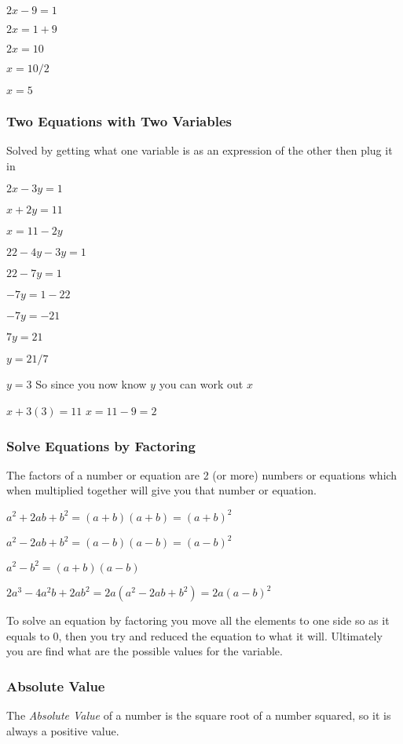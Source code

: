 \documentclass{article}
\begin{document}
$2x - 9 = 1$

$2x = 1 + 9 $

$2x = 10 $

$x = 10 /2 $

$x = 5$

\subsubsection{Two Equations with Two Variables}
Solved by getting what one variable is as an expression of the other then plug it in

$2x -3y = 1 $  
       
$x + 2y = 11 $	     

$x = 11 -2y$

$22-4y -3y = 1$

$22 - 7y = 1$

$-7y = 1-22$

$-7y = -21$

$7y = 21$

$y =21/7$

$y = 3$
So since you now know $y$ you can work out $x$

$x + 3 (3) = 11$
$x = 11 -9 = 2$

\subsubsection{Solve Equations by Factoring}
The factors of a number or equation are 2 (or more) numbers or equations which when multiplied together will give you that number or equation.

$a^{2} + 2ab + b^{2} = (a + b) (a + b)  = (a + b)^{2}$

$a^{2} - 2ab + b^{2} = (a - b) (a - b)  = (a - b)^{2}$

$a^{2} - b^{2} = (a + b) (a - b)$

$2a^{3} -4a^{2}b + 2ab^{2} = 2a ( a^{2} - 2ab + b^{2} ) = 2a (a-b)^{2}$

To solve an equation by factoring you move all the elements to one side so as it equals to 0,
then you try and reduced the equation to what it will.
Ultimately you are find what are the possible values for the variable.

\subsubsection{Absolute Value}
The \textit{Absolute Value} of a number is the square root of a number squared, so it is always a positive value. 
\end{document}
